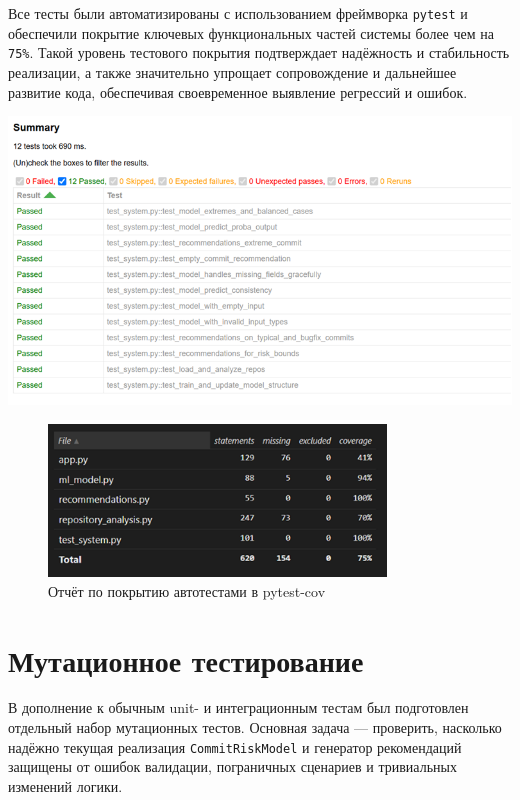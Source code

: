 Все тесты были автоматизированы с использованием фреймворка \texttt{pytest} и обеспечили покрытие ключевых функциональных частей системы более чем на \verb|75%|. Такой уровень тестового покрытия подтверждает надёжность и стабильность реализации, а также значительно упрощает сопровождение и дальнейшее развитие кода, обеспечивая своевременное выявление регрессий и ошибок.

\begin{center}
	\includegraphics[width=\textwidth]{my_folder/images/test_result.png}
	\label{fig:test_pytest}
\end{center}

\begin{figure}[H]
	\centering
	\includegraphics[width=0.8\textwidth]{my_folder/images/coverage.png}
	\caption{Отчёт по покрытию автотестами в pytest-cov}
	\label{tab:test_pytest2}
\end{figure}


\section{Мутационное тестирование}

В дополнение к обычным unit- и интеграционным тестам был подготовлен отдельный набор мутационных тестов.
Основная задача ­— проверить, насколько надёжно текущая реализация
\texttt{CommitRiskModel} и генератор рекомендаций защищены от ошибок
валидации, пограничных сценариев и тривиальных изменений логики.

